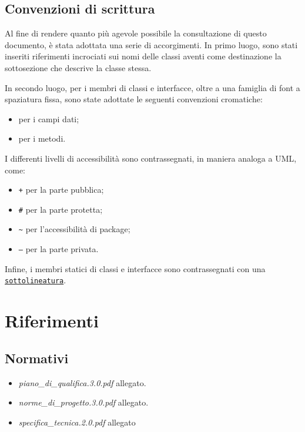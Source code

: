 \subsection{Convenzioni di scrittura}
Al fine di rendere quanto più agevole possibile la consultazione di questo documento, è stata adottata una serie di accorgimenti. In primo luogo, sono stati inseriti riferimenti incrociati sui nomi delle classi aventi come destinazione la sottosezione che descrive la classe stessa.

In secondo luogo, per i membri di classi e interfacce, oltre a una famiglia di font a spaziatura fissa, sono state adottate le seguenti convenzioni cromatiche:
\begin{itemize}[noitemsep,nolistsep]
  \item {} per i campi dati;
  \item {} per i metodi.
\end{itemize}

I differenti livelli di accessibilità sono contrassegnati, in maniera analoga a UML, come:
\begin{itemize}
  \item \texttt{\ttfamily +} per la parte pubblica;
  \item \texttt{\ttfamily \#} per la parte protetta;
  \item \texttt{\ttfamily \textasciitilde} per  l'accessibilità di package;
  \item \texttt{\ttfamily --} per la parte privata.
\end{itemize}

Infine, i membri statici di classi e interfacce sono contrassegnati con una \underline{\texttt{sottolineatura}}.
\clearpage

\section{Riferimenti}
\subsection{Normativi}
\begin{itemize}
\item[] \textit{piano\_di\_qualifica.3.0.pdf} allegato.
\item[] \textit{norme\_di\_progetto.3.0.pdf} allegato.
\item[] \textit{specifica\_tecnica.2.0.pdf} allegato
\end{itemize}

